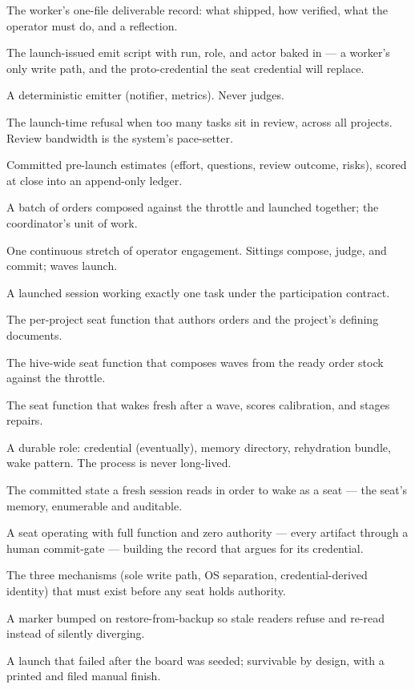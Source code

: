 \begin{description}[style=nextline,itemsep=1pt]
\item[result report] The worker's one-file deliverable record: what shipped, how verified, what the operator must do, and a reflection.
\item[wrapper] The launch-issued emit script with run, role, and actor baked in --- a worker's only write path, and the proto-credential the seat credential will replace.
\item[instrument] A deterministic emitter (notifier, metrics). Never judges.
\item[throttle] The launch-time refusal when too many tasks sit in review, across all projects. Review bandwidth is the system's pace-setter.
\item[predictions / calibration] Committed pre-launch estimates (effort, questions, review outcome, risks), scored at close into an append-only ledger.
\item[wave] A batch of orders composed against the throttle and launched together; the coordinator's unit of work.
\item[sitting] One continuous stretch of operator engagement. Sittings compose, judge, and commit; waves launch.
\item[worker] A launched session working exactly one task under the participation contract.
\item[design partner] The per-project seat function that authors orders and the project's defining documents.
\item[coordinator (seat)] The hive-wide seat function that composes waves from the ready order stock against the throttle.
\item[improver] The seat function that wakes fresh after a wave, scores calibration, and stages repairs.
\item[seat] A durable role: credential (eventually), memory directory, rehydration bundle, wake pattern. The process is never long-lived.
\item[rehydration bundle] The committed state a fresh session reads in order to wake as a seat --- the seat's memory, enumerable and auditable.
\item[rehearsal] A seat operating with full function and zero authority --- every artifact through a human commit-gate --- building the record that argues for its credential.
\item[the gate] The three mechanisms (sole write path, OS separation, credential-derived identity) that must exist before any seat holds authority.
\item[generation token] A marker bumped on restore-from-backup so stale readers refuse and re-read instead of silently diverging.
\item[half-launch] A launch that failed after the board was seeded; survivable by design, with a printed and filed manual finish.
\end{description}
\normalsize

